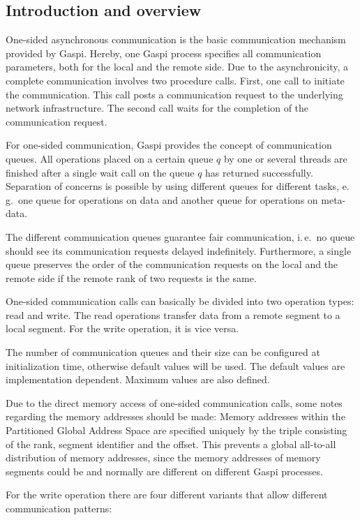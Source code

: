 \documentclass[a4paper]{article}
\newlength{\st}\setlength{\st}{0pt}
\newcommand{\GASPI}{{\sc Gaspi}}
\begin{document}
\subsection{Introduction and overview}

One-sided asynchronous communication is the basic communication
mechanism provided by \GASPI{}. Hereby, one \GASPI{} process specifies
all communication parameters, both for the local and the remote
side. Due to the asynchronicity, a complete communication
involves two procedure calls. First, one call to initiate the
communication. This call posts a communication request to the
underlying network infrastructure. The second call waits for the
completion of the communication request.

For one-sided communication, \GASPI{} provides the concept of communication
queues.  All operations placed on a certain queue $q$ by one or
several threads are finished after a single wait call on the queue $q$ has
returned successfully. Separation of concerns is possible by using different queues
for different tasks, e.\,g.\ one queue for operations on data and
another queue for operations on meta-data.

The different communication queues guarantee fair communication, i.\,e.\ no queue
should see its communication requests delayed indefinitely. Furthermore,
a single queue preserves the order of the communication requests on the local and the
remote side if the remote rank of two requests is the same.

One-sided communication calls can basically be divided into two
operation types: read and write.
The read operations transfer data from a remote segment
to a local segment.
For the write operation, it is vice versa.

The number of communication queues and their size can be configured at initialization
time, otherwise default values will be used. The default values are implementation
dependent. Maximum values are also defined.

Due to the direct memory access of one-sided communication calls, some
notes regarding the memory addresses should be made: Memory addresses
within the Partitioned Global Address Space are specified uniquely by
the triple consisting of the rank, segment identifier and the
offset. This prevents a global all-to-all distribution of memory
addresses, since the memory addresses of memory segments could be and
normally are different on different \GASPI{} processes.

For the write operation there are four different variants that allow different
communication patterns:
\end{document}
